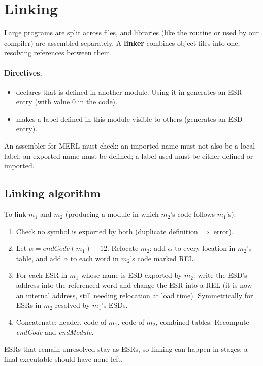 \section{Linking}

Large programs are split across files, and libraries (like the  routine or
 used by our compiler) are assembled separately. A \textbf{linker} combines
object files into one, resolving references between them.

\paragraph{Directives.}
\begin{itemize}
  \item {} declares that  is defined in another module.
        Using it in  generates an ESR entry (with value 0 in the code).
  \item {} makes a label defined in this module visible to others
        (generates an ESD entry).
\end{itemize}
An assembler for MERL must check: an imported name must not also be a local label;
an exported name must be defined; a label used must be either defined or imported.

\subsection{Linking algorithm}
To link $m_1$ and $m_2$ (producing a module in which $m_2$'s code follows $m_1$'s):
\begin{enumerate}
  \item Check no symbol is exported by both (duplicate definition $\Rightarrow$ error).
  \item Let $\alpha = \mathit{endCode}(m_1) - 12$. Relocate $m_2$: add $\alpha$ to every
        location in $m_2$'s table, and add $\alpha$ to each word in $m_2$'s code marked REL.
  \item For each ESR in $m_1$ whose name is ESD-exported by $m_2$: write the ESD's address
        into the referenced word and change the ESR into a REL (it is now an internal
        address, still needing relocation at load time). Symmetrically for ESRs in $m_2$
        resolved by $m_1$'s ESDs.
  \item Concatenate: header, code of $m_1$, code of $m_2$, combined tables. Recompute
        \textit{endCode} and \textit{endModule}.
\end{enumerate}
ESRs that remain unresolved stay as ESRs, so linking can happen in stages; a final
executable should have none left.


